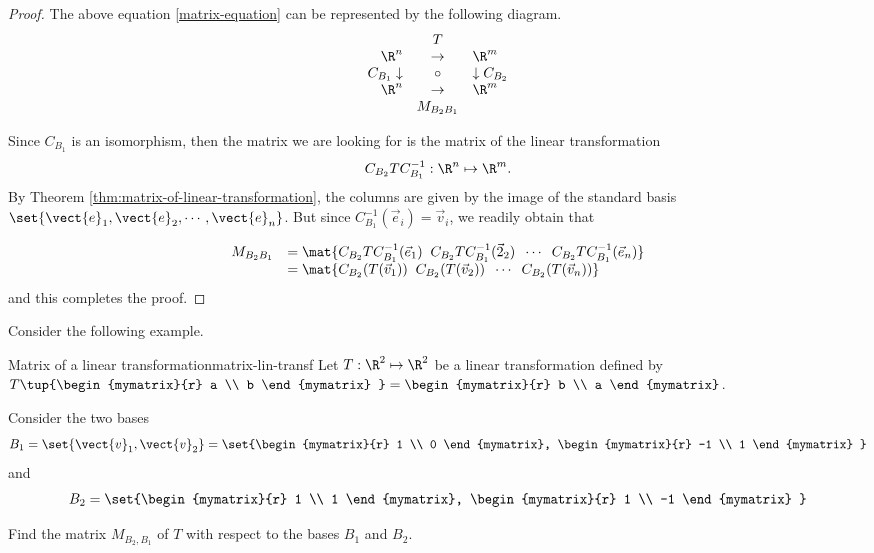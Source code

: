 \begin{proof}
The above equation \ref{matrix-equation} can be represented by the following diagram.
\begin{equation*}
\begin{array}{rrcll}
&  & T &  &  \\
& \R^n & \rightarrow  & \R^m & \\
& C_{B_{1} }\downarrow  & \circ  & \downarrow C_{B_{2} } &  \\
& \R^{n} & \rightarrow  & \R^{m} &  \\
&  & M_{B_{2} B_{1} } &  &
\end{array}
\end{equation*}

Since $C_{B_1}$ is an isomorphism, then the matrix we are looking for is the matrix of the linear transformation 
\[   C_{B_2} T C^{-1}_{B_1} : \R^n \mapsto \R^m. \]
By Theorem \ref{thm:matrix-of-linear-transformation}, the columns are
given by the image of the standard basis $\set{\vect{e}_1,
\vect{e}_2, \cdots, \vect{e}_n }$. But since $C^{-1}_{B_1}( \vec{e}_i) = \vec{v}_i$, we readily obtain that 

\[ \begin{array}{ll} 
M_{B_{2} B_{1}} 
& = \mat{C_{B_2}T C^{-1}_{B_1} (\vec{e}_1) \;\; C_{B_2}T C^{-1}_{B_1} (\vec{2}_2) \;\; \cdots \;\; C_{B_2}T C^{-1}_{B_1} (\vec{e}_n) } \\
& = \mat{C_{B_2}(T(\vec{v}_1)) \;\; C_{B_2}(T(\vec{v}_2)) \;\; \cdots \;\; C_{B_2}(T(\vec{v}_n)) } 
\end{array}\]
and this completes the proof. 
\end{proof}

Consider the following example.

\begin{example}{Matrix of a linear transformation}{matrix-lin-transf}
Let $T: \R^2 \mapsto \R^2$ be a linear transformation defined by $T \tup{\begin{mymatrix}{r}
a \\
b
\end{mymatrix} } = \begin{mymatrix}{r}
b \\
a 
\end{mymatrix}$. 

Consider the two bases
\[
B_1 = \set{\vect{v}_{1}, \vect{v}_{2} } = \set{\begin{mymatrix}{r}
1 \\
0
\end{mymatrix}, \begin{mymatrix}{r}
-1 \\
1
\end{mymatrix}
}
\]
 and 
\[
B_2 = \set{\begin{mymatrix}{r}
1 \\
1
\end{mymatrix}, \begin{mymatrix}{r}
1 \\
-1
\end{mymatrix}
}
\]

Find the matrix $M_{B_2,B_1}$ of $T$ with respect to the bases $B_1$ and $B_2$. 
\end{example}

